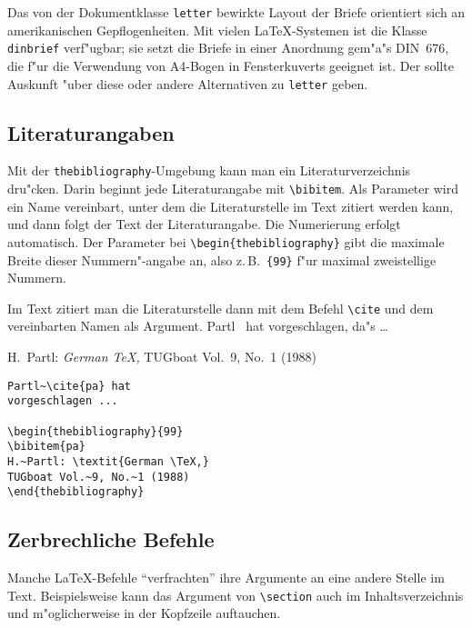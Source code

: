 Das von der Dokumentklasse \texttt{letter} bewirkte Layout der Briefe 
orientiert sich an amerikanischen Gepflogenheiten.
Mit vielen \LaTeX-Systemen ist die Klasse 
\texttt{dinbrief} verf"ugbar; sie setzt die Briefe in einer
Anordnung gem"a"s DIN~676, 
die f"ur die Verwendung von A4-Bogen in Fensterkuverts geeignet ist.
Der \local{} sollte Auskunft "uber diese oder andere Alternativen zu
\texttt{letter} geben.

\subsection{Literaturangaben}

Mit der \texttt{thebibliography}-Umgebung kann man ein
Literaturverzeichnis dru"cken.
Darin beginnt jede Literaturangabe mit \verb|\bibitem|.
Als Parameter wird ein Name vereinbart, unter dem die
Literaturstelle im Text zitiert werden kann, und
dann folgt der Text der Literaturangabe.
Die Numerierung erfolgt automatisch.
Der Parameter bei \verb|\begin{thebibliography}| gibt die
maximale Breite dieser Nummern"-angabe an, also z.\,B.\ 
\verb|{99}| f"ur maximal zweistellige Nummern.

Im Text zitiert man die Literaturstelle dann mit dem Befehl \verb|\cite|
und dem vereinbarten Namen als Argument.
\exa
Partl~\cite{pa} hat
vorgeschlagen, da"s \dots
 
\begin{thebibliography}{99}
H.~Partl: \textit{German \TeX,}
TUG\-boat Vol.~9, No.~1 (1988)
\end{thebibliography}
\exb
\begin{verbatim}
Partl~\cite{pa} hat
vorgeschlagen ...
 
\begin{thebibliography}{99}
\bibitem{pa}
H.~Partl: \textit{German \TeX,}
TUGboat Vol.~9, No.~1 (1988)
\end{thebibliography}
\end{verbatim}
\exc

 
\subsection{Zerbrechliche Befehle}
 
Manche \LaTeX-Befehle "`verfrachten"' ihre Argumente an eine andere
Stelle im Text. 
Beispielsweise kann das Argument von \verb|\section|
auch im Inhaltsverzeichnis und m"oglicherweise
in der Kopfzeile auftauchen.  

